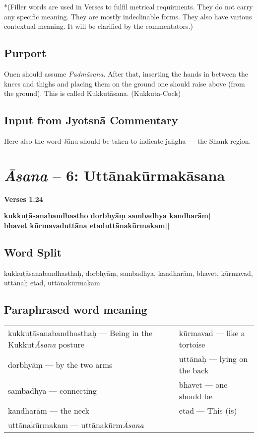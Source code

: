 *(Filler words are used in Verses to fulfil metrical requirments. They do not carry any specific meaning. They are mostly indeclinable forms. They also have various contextual meaning. It will be clarified by the commentators.)
\vspace{-10pt}

\subsection*{Purport}
\vspace{-10pt}

Onen should assume \textit{Padmāsana}. After that, inserting the hands in between the knees and thighs and placing them on the ground one should raise above (from the ground). This is called Kukkutāsana. (Kukkuta-Cock)
\vspace{-10pt}

\subsection*{Input from Jyotsnā Commentary}
\vspace{-10pt}

Here also the word Jānu should be taken to indicate jaṅgha --- the Shank region. 

\section*{\textit{Āsana} -- 6: Uttānakūrmakāsana}

\noindent \textbf{Verses 1.24}

\begin{shloka}
\textbf{kukkuṭāsanabandhastho dorbhyāṃ sambadhya kandharām|}\\
\textbf{bhavet kūrmavaduttāna etaduttānakūrmakam||}
\end{shloka}

\subsection*{Word Split}

kukkuṭāsanabandhasthaḥ,  dorbhyāṃ, sambadhya,  kandharām, bhavet,  kūrmavad, uttānaḥ etad, uttānakūrmakam

\subsection*{Paraphrased word meaning}

\begin{longtable}{>{\noindent\raggedright}p{5cm}>{\noindent\raggedright}p{5cm}}
kukkuṭāsanabandhasthaḥ --- Being in the Kukkut\textit{Āsana} posture  & kūrmavad --- like a tortoise\tabularnewline
dorbhyāṃ --- by the two arms  & uttānaḥ --- lying on the back\tabularnewline
sambadhya --- connecting  & bhavet  --- one should be\tabularnewline
kandharām --- the neck  & etad --- This (is)\tabularnewline
uttānakūrmakam --- uttānakūrm\textit{Āsana} & 
\end{longtable}

